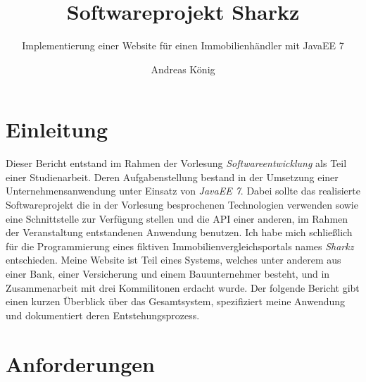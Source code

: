 \documentclass[a4paper]{scrreprt}
\begin{document}
\begin{titlepage}
	\title{Softwareprojekt Sharkz}
	\subtitle{Implementierung einer Website für einen Immobilienhändler mit JavaEE 7}
	\subject{Softwareentwicklung}
	\author{Andreas König}
	\maketitle
\end{titlepage}

\tableofcontents

\chapter{Einleitung}
Dieser Bericht entstand im Rahmen der Vorlesung \textit{Softwareentwicklung} als Teil einer Studienarbeit. Deren Aufgabenstellung bestand in der Umsetzung einer Unternehmensanwendung unter Einsatz von \textit{JavaEE 7}. Dabei sollte das realisierte Softwareprojekt die in der Vorlesung besprochenen Technologien verwenden sowie eine Schnittstelle zur Verfügung stellen und die API einer anderen, im Rahmen der Veranstaltung entstandenen Anwendung benutzen.
\newline
\newline
Ich habe mich schließlich für die Programmierung eines fiktiven Immobilienvergleichsportals names \textit{Sharkz} entschieden. Meine Website ist Teil eines Systems, welches unter anderem aus einer Bank, einer Versicherung und einem Bauunternehmer besteht, und in Zusammenarbeit mit drei Kommilitonen erdacht wurde.
\newline
\newline
Der folgende Bericht gibt einen kurzen Überblick über das Gesamtsystem, spezifiziert meine Anwendung und dokumentiert deren Entstehungsprozess.

\chapter{Anforderungen}
\end{document}
